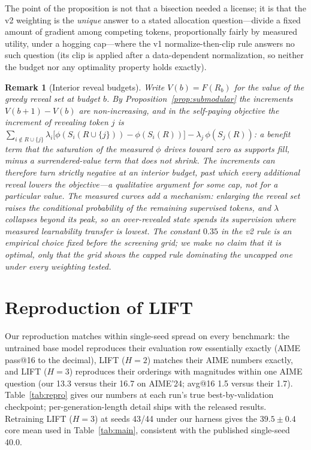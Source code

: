 \documentclass{article} %
\newtheorem{remark}{Remark}
\begin{document}
The point of the proposition is not that a bisection needed a license; it is that the v2 weighting is the \emph{unique} answer to a stated allocation question---divide a fixed amount of gradient among competing tokens, proportionally fairly by measured utility, under a hogging cap---where the v1 normalize-then-clip rule answers no such question (its clip is applied after a data-dependent normalization, so neither the budget nor any optimality property holds exactly).

\begin{remark}[Interior reveal budgets]
\label{rem:budget}
Write $V(b) = F(R_b)$ for the value of the greedy reveal set at budget $b$. By Proposition~\ref{prop:submodular} the increments $V(b{+}1) - V(b)$ are non-increasing, and in the self-paying objective the increment of revealing token $j$ is
$\sum_{i \notin R \cup \{j\}} \lambda_i \big[\phi(S_i(R \cup \{j\})) - \phi(S_i(R))\big] - \lambda_j\, \phi(S_j(R))$:
a benefit term that the saturation of the measured $\phi$ drives toward zero as supports fill, minus a surrendered-value term that does not shrink. The increments can therefore turn strictly negative at an interior budget, past which every additional reveal lowers the objective---a qualitative argument for \emph{some} cap, not for a particular value. The measured curves add a mechanism: enlarging the reveal set raises the conditional probability of the remaining supervised tokens, and $\lambda$ collapses beyond its peak, so an over-revealed state spends its supervision where measured learnability transfer is lowest. The constant $0.35$ in the v2 rule is an empirical choice fixed before the screening grid; we make no claim that it is optimal, only that the grid shows the capped rule dominating the uncapped one under every weighting tested.
\end{remark}

\section{Reproduction of LIFT}
\label{app:repro}
Our reproduction matches \citet{lift2026} within single-seed spread on every benchmark: the untrained base model reproduces their evaluation row essentially exactly (AIME pass@16 to the decimal), LIFT ($H{=}2$) matches their AIME numbers exactly, and LIFT ($H{=}3$) reproduces their orderings with magnitudes within one AIME question (our 13.3 versus their 16.7 on AIME'24; avg@16 1.5 versus their 1.7). Table~\ref{tab:repro} gives our numbers at each run's true best-by-validation checkpoint; per-generation-length detail ships with the released results. Retraining LIFT ($H{=}3$) at seeds 43/44 under our harness gives the $39.5 \pm 0.4$ core mean used in Table~\ref{tab:main}, consistent with the published single-seed 40.0.
\end{document}
